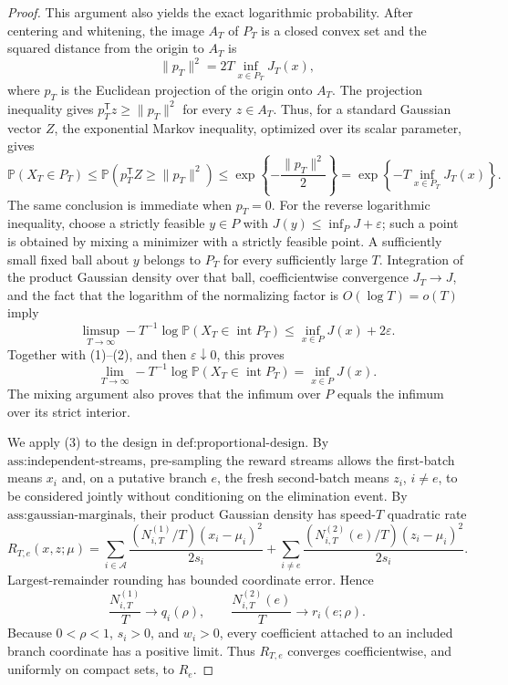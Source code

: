 \documentclass{article}
\begin{document}
\begin{proof}
This argument also yields the exact logarithmic probability. After centering and whitening, the image \(A_T\) of \(P_T\) is a closed convex set and the squared distance from the origin to \(A_T\) is
\[
 \lVert p_T\rVert^2=2T\inf_{x\in P_T}J_T(x),
\]
where \(p_T\) is the Euclidean projection of the origin onto \(A_T\). The projection inequality gives \(p_T^{\mathsf T}z\geq\lVert p_T\rVert^2\) for every \(z\in A_T\). Thus, for a standard Gaussian vector \(Z\), the exponential Markov inequality, optimized over its scalar parameter, gives
\[
 \mathbb P(X_T\in P_T)
 \leq\mathbb P\!\left(p_T^{\mathsf T}Z\geq\lVert p_T\rVert^2\right)
 \leq \exp\!\left\{-\frac{\lVert p_T\rVert^2}{2}\right\}
 =\exp\!\left\{-T\inf_{x\in P_T}J_T(x)\right\}. \tag{2}
\]
The same conclusion is immediate when \(p_T=0\). For the reverse logarithmic inequality, choose a strictly feasible \(y\in P\) with \(J(y)\leq\inf_PJ+\varepsilon\); such a point is obtained by mixing a minimizer with a strictly feasible point. A sufficiently small fixed ball about \(y\) belongs to \(P_T\) for every sufficiently large \(T\). Integration of the product Gaussian density over that ball, coefficientwise convergence \(J_T\to J\), and the fact that the logarithm of the normalizing factor is \(O(\log T)=o(T)\) imply
\[
 \limsup_{T\to\infty}-T^{-1}\log
 \mathbb P(X_T\in\operatorname{int}P_T)
 \leq \inf_{x\in P}J(x)+2\varepsilon.
\]
Together with (1)--(2), and then \(\varepsilon\downarrow0\), this proves
\[
 \lim_{T\to\infty}-T^{-1}\log
 \mathbb P(X_T\in\operatorname{int}P_T)
 =\inf_{x\in P}J(x). \tag{3}
\]
The mixing argument also proves that the infimum over \(P\) equals the infimum over its strict interior.

We apply (3) to the design in \(\text{def:proportional-design}\). By \(\text{ass:independent-streams}\), pre-sampling the reward streams allows the first-batch means \(x_i\) and, on a putative branch \(e\), the fresh second-batch means \(z_i\), \(i\ne e\), to be considered jointly without conditioning on the elimination event. By \(\text{ass:gaussian-marginals}\), their product Gaussian density has speed-\(T\) quadratic rate
\[
 R_{T,e}(x,z;\mu)
 =\sum_{i\in\mathcal A}
 \frac{(N_{i,T}^{(1)}/T)(x_i-\mu_i)^2}{2s_i}
 +\sum_{i\ne e}
 \frac{(N_{i,T}^{(2)}(e)/T)(z_i-\mu_i)^2}{2s_i}.
\]
Largest-remainder rounding has bounded coordinate error. Hence
\[
 \frac{N_{i,T}^{(1)}}T\longrightarrow q_i(\rho),
 \qquad
 \frac{N_{i,T}^{(2)}(e)}T\longrightarrow r_i(e;\rho).
\]
Because \(0<\rho<1\), \(s_i>0\), and \(w_i>0\), every coefficient attached to an included branch coordinate has a positive limit. Thus \(R_{T,e}\) converges coefficientwise, and uniformly on compact sets, to \(R_e\).


\end{proof}
\end{document}

